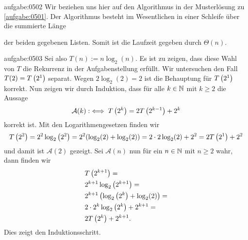 \begin{antwort}{aufgabe:0502}
Wir beziehen uns hier auf den Algorithmus in der Musterlösung zu \cref{aufgabe:0501}. Der Algorithmus besteht im Wesentlichen in einer Schleife über die summierte Länge
\begin{center}
\end{center}
der beiden gegebenen Listen. Somit ist die Laufzeit gegeben durch $\Theta(n)$.
\end{antwort}


\begin{antwort}{aufgabe:0503}
Sei also $T(n) := n\log_2(n)$. Es ist zu zeigen, dass diese Wahl von $T$ die Rekurrenz in der Aufgabenstellung erfüllt. Wir untersuchen den Fall $T(2) = T\left(2^1\right)$ separat.
Wegen $2\log_2(2) = 2$ ist die Behauptung für $T\left(2^1\right)$ korrekt. Nun zeigen wir durch Induktion, dass für alle $k\in\mathbb{N}$ mit $k\geq 2$ die Aussage
\begin{align*}
    \mathcal{A}(k) :\iff T\left(2^k\right) = 2T\left(2^{k-1}\right) + 2^k
\end{align*}
korrekt ist. Mit den Logarithmengesetzen finden wir
\begin{align*}
    T\left(2^2\right) = 2^2\log_2\left(2^2\right) = 2^2(\log_2(2) + \log_2(2)) = 2\cdot 2\log_2(2) + 2^2 = 2T\left(2^1\right) + 2^2
\end{align*}
und damit ist $\mathcal{A}(2)$ gezeigt. Sei $\mathcal{A}(n)$ nun für ein $n\in\mathbb{N}$ mit $n\geq 2$ wahr, dann finden wir
\begin{align*}
    &T\left(2^{k+1}\right) = \\
    &2^{k+1}\log_2\left(2^{k+1}\right) = \\
    &2^{k+1}\left(\log_2\left(2^{k}\right) + \log_2(2)\right) = \\
    &2\cdot 2^{k}\log_2\left(2^{k}\right) + 2^{k+1} = \\
    &2T\left(2^{k}\right) + 2^{k+1}.
\end{align*}
Dies zeigt den Induktionsschritt.
\end{antwort}


\clearpage
\shipoutAnswer